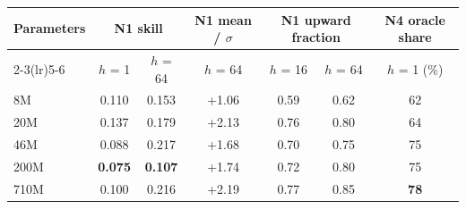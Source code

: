 \begin{tabular}{@{}lcccccc@{}}
\toprule
\textbf{Parameters} & \multicolumn{2}{c}{\textbf{N1 skill}} & \textbf{N1 mean / $\sigma$} & \multicolumn{2}{c}{\textbf{N1 upward fraction}} & \textbf{N4 oracle share} \\
\cmidrule(lr){2-3}\cmidrule(lr){5-6}
 & $h$ = 1 & $h$ = 64 & $h$ = 64 & $h$ = 16 & $h$ = 64 & $h$ = 1 (\%) \\
\midrule
8M & \textminus{}0.110 & \textminus{}0.153 & +1.06 & 0.59 & 0.62 & 62 \\
20M & \textminus{}0.137 & \textminus{}0.179 & +2.13 & 0.76 & 0.80 & 64 \\
46M & \textminus{}0.088 & \textminus{}0.217 & +1.68 & 0.70 & 0.75 & 75 \\
200M & \textbf{\textminus{}0.075} & \textbf{\textminus{}0.107} & +1.74 & 0.72 & 0.80 & 75 \\
710M & \textminus{}0.100 & \textminus{}0.216 & +2.19 & 0.77 & 0.85 & \textbf{78} \\
\bottomrule
\end{tabular}
